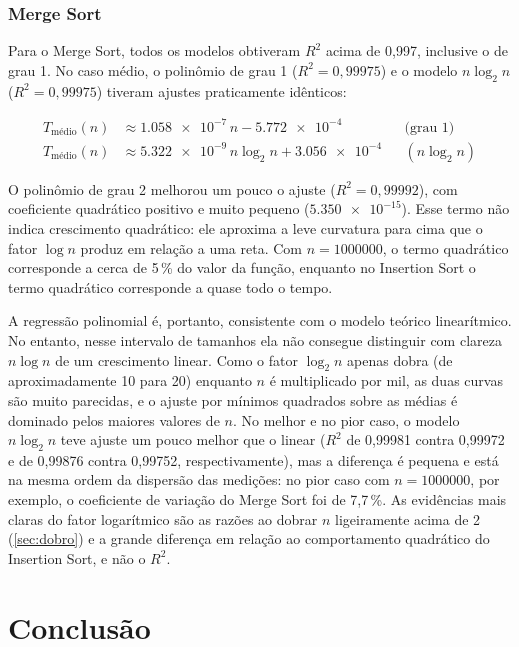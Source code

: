 \documentclass[
    12pt,
    oneside,
    a4paper,
    openany,
    chapter=TITLE,
    english,
    brazil
]{abntex2}
\begin{document}
\subsection{Merge Sort}

Para o Merge Sort, todos os modelos obtiveram $R^2$ acima de 0,997, inclusive o de grau 1. No caso médio, o polinômio de grau 1 ($R^2 = 0{,}99975$) e o modelo $n \log_2 n$ ($R^2 = 0{,}99975$) tiveram ajustes praticamente idênticos:

\begin{align*}
    T_{\text{médio}}(n) &\approx \num{1.058e-7}\, n - \num{5.772e-4} && \text{(grau 1)} \\
    T_{\text{médio}}(n) &\approx \num{5.322e-9}\, n \log_2 n + \num{3.056e-4} && (n \log_2 n)
\end{align*}

O polinômio de grau 2 melhorou um pouco o ajuste ($R^2 = 0{,}99992$), com coeficiente quadrático positivo e muito pequeno ($\num{5.350e-15}$). Esse termo não indica crescimento quadrático: ele aproxima a leve curvatura para cima que o fator $\log n$ produz em relação a uma reta. Com $n = \num{1000000}$, o termo quadrático corresponde a cerca de 5\,\% do valor da função, enquanto no Insertion Sort o termo quadrático corresponde a quase todo o tempo.

A regressão polinomial é, portanto, consistente com o modelo teórico linearítmico. No entanto, nesse intervalo de tamanhos ela não consegue distinguir com clareza $n \log n$ de um crescimento linear. Como o fator $\log_2 n$ apenas dobra (de aproximadamente 10 para 20) enquanto $n$ é multiplicado por mil, as duas curvas são muito parecidas, e o ajuste por mínimos quadrados sobre as médias é dominado pelos maiores valores de $n$. No melhor e no pior caso, o modelo $n \log_2 n$ teve ajuste um pouco melhor que o linear ($R^2$ de 0,99981 contra 0,99972 e de 0,99876 contra 0,99752, respectivamente), mas a diferença é pequena e está na mesma ordem da dispersão das medições: no pior caso com $n = \num{1000000}$, por exemplo, o coeficiente de variação do Merge Sort foi de 7,7\,\%. As evidências mais claras do fator logarítmico são as razões ao dobrar $n$ ligeiramente acima de 2 (\autoref{sec:dobro}) e a grande diferença em relação ao comportamento quadrático do Insertion Sort, e não o $R^2$.

\chapter{Conclusão}
\label{cap:conclusao}
\end{document}
